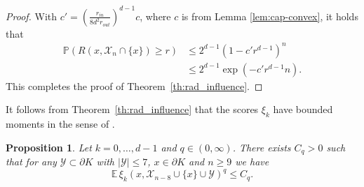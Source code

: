 \documentclass[12pt]{article}
\newcommand{\IE}{\mathds{E}}
\def\P{{\mathds{P}}}
\def\cX{{\mathcal X}}
\def\cY{{\mathcal Y}}
\def\bd{{\partial}}
\newtheorem{proposition}[theorem]{Proposition}
\theoremstyle{definition}
\begin{document}
\begin{proof}
With $c'=(\frac{r_{in}}{8 d^2 r_{out}})^{d-1}c$, where $c$ is from Lemma \ref{lem:cap-convex}, it holds that
\begin{align*}
\P( R(x, \cX_{n} \cap\{x\}) \geq r)
& \leq
2^{d-1} \left(1- c' r^{d-1} \right)^{n} 
\\ & \leq
2^{d-1} \exp(- c' r^{d-1} n).
\end{align*}
This completes the proof of Theorem~\ref{th:rad_influence}.
\end{proof}

It follows from Theorem~\ref{th:rad_influence} that the scores $\xi_k$ have bounded moments in the sense of \cite{LachSchulteYukich}.

\begin{proposition}\label{pro:moments}
Let $k=0,\dots,d-1$ and $q\in (0,\infty)$. There exists $C_q>0$ such that for any $\cY\subset \bd K$ with $|\cY|\le 7$, $x\in \partial K$ and $n\ge 9$ we have
\[
\IE\, \xi_k(x,\cX_{n-8}\cup \{x\}\cup \cY)^{q} \le C_q.
\]
\end{proposition}
\end{document}

